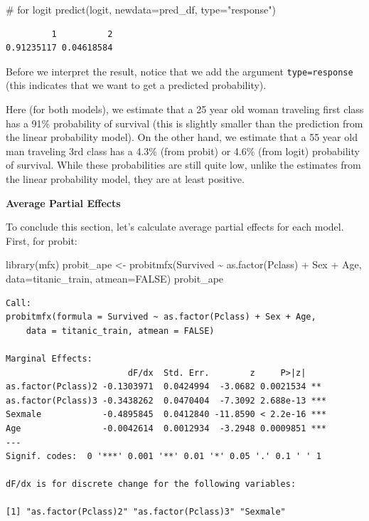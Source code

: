 \documentclass[
  letterpaper,
  DIV=11,
  numbers=noendperiod]{scrreprt}
\newenvironment{Shaded}{\begin{snugshade}}{\end{snugshade}}
\newcommand{\AttributeTok}[1]{\textcolor[rgb]{0.40,0.45,0.13}{#1}}
\newcommand{\CommentTok}[1]{\textcolor[rgb]{0.37,0.37,0.37}{#1}}
\newcommand{\ConstantTok}[1]{\textcolor[rgb]{0.56,0.35,0.01}{#1}}
\newcommand{\FunctionTok}[1]{\textcolor[rgb]{0.28,0.35,0.67}{#1}}
\newcommand{\NormalTok}[1]{\textcolor[rgb]{0.00,0.23,0.31}{#1}}
\newcommand{\OtherTok}[1]{\textcolor[rgb]{0.00,0.23,0.31}{#1}}
\newcommand{\SpecialCharTok}[1]{\textcolor[rgb]{0.37,0.37,0.37}{#1}}
\newcommand{\StringTok}[1]{\textcolor[rgb]{0.13,0.47,0.30}{#1}}
\begin{document}
\begin{Shaded}
\begin{Highlighting}[]
\CommentTok{\# for logit}
\FunctionTok{predict}\NormalTok{(logit, }\AttributeTok{newdata=}\NormalTok{pred\_df, }\AttributeTok{type=}\StringTok{"response"}\NormalTok{)}
\end{Highlighting}
\end{Shaded}

\begin{verbatim}
         1          2 
0.91235117 0.04618584 
\end{verbatim}

Before we interpret the result, notice that we add the argument
\texttt{type=response} (this indicates that we want to get a predicted
probability).

Here (for both models), we estimate that a 25 year old woman traveling
first class has a 91\% probability of survival (this is slightly smaller
than the prediction from the linear probability model). On the other
hand, we estimate that a 55 year old man traveling 3rd class has a 4.3\%
(from probit) or 4.6\% (from logit) probability of survival. While these
probabilities are still quite low, unlike the estimates from the linear
probability model, they are at least positive.

\textbf{Average Partial Effects}

To conclude this section, let's calculate average partial effects for
each model. First, for probit:

\begin{Shaded}
\begin{Highlighting}[]
\FunctionTok{library}\NormalTok{(mfx)}
\NormalTok{probit\_ape }\OtherTok{\textless{}{-}} \FunctionTok{probitmfx}\NormalTok{(Survived }\SpecialCharTok{\textasciitilde{}} \FunctionTok{as.factor}\NormalTok{(Pclass) }\SpecialCharTok{+}\NormalTok{ Sex }\SpecialCharTok{+}\NormalTok{ Age, }
                        \AttributeTok{data=}\NormalTok{titanic\_train, }
                        \AttributeTok{atmean=}\ConstantTok{FALSE}\NormalTok{)}
\NormalTok{probit\_ape}
\end{Highlighting}
\end{Shaded}

\begin{verbatim}
Call:
probitmfx(formula = Survived ~ as.factor(Pclass) + Sex + Age, 
    data = titanic_train, atmean = FALSE)

Marginal Effects:
                        dF/dx  Std. Err.        z     P>|z|    
as.factor(Pclass)2 -0.1303971  0.0424994  -3.0682 0.0021534 ** 
as.factor(Pclass)3 -0.3438262  0.0470404  -7.3092 2.688e-13 ***
Sexmale            -0.4895845  0.0412840 -11.8590 < 2.2e-16 ***
Age                -0.0042614  0.0012934  -3.2948 0.0009851 ***
---
Signif. codes:  0 '***' 0.001 '**' 0.01 '*' 0.05 '.' 0.1 ' ' 1

dF/dx is for discrete change for the following variables:

[1] "as.factor(Pclass)2" "as.factor(Pclass)3" "Sexmale"           
\end{verbatim}
\end{document}
